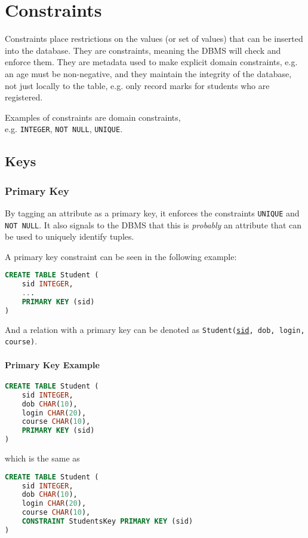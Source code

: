 \chapter{Constraints}
Constraints place restrictions on the values (or set of values) that can be inserted into the database. They are  constraints, meaning the DBMS will check and enforce them. They are metadata used to make explicit domain constraints, e.g. an age must be non-negative, and they maintain the integrity of the database, not just locally to the table, e.g. only record marks for students who are registered.

Examples of constraints are domain constraints, \\
e.g. \verb|INTEGER|, \verb|NOT NULL|, \verb|UNIQUE|.

\section{Keys}
\subsection{Primary Key}
By tagging an attribute as a primary key, it enforces the constraints \verb|UNIQUE| and \verb|NOT NULL|. It also signals to the DBMS that this is \textit{probably} an attribute that can be used to uniquely identify tuples.

A primary key constraint can be seen in the following example:
\begin{lstlisting}[language=SQL,tabsize=3]
CREATE TABLE Student (
	sid INTEGER,
	...
	PRIMARY KEY (sid)
)
\end{lstlisting}

And a relation with a primary key can be denoted as \texttt{Student(\underline{sid}, dob, login, course)}.

\subsubsection{Primary Key Example}
\begin{lstlisting}[language=SQL,tabsize=3]
CREATE TABLE Student (
	sid INTEGER,
	dob CHAR(10),
	login CHAR(20),
	course CHAR(10),
	PRIMARY KEY (sid)
)
\end{lstlisting}

which is the same as

\begin{lstlisting}[language=SQL, tabsize=3]
CREATE TABLE Student (
	sid INTEGER,
	dob CHAR(10),
	login CHAR(20),
	course CHAR(10),
	CONSTRAINT StudentsKey PRIMARY KEY (sid)
)
\end{lstlisting}

